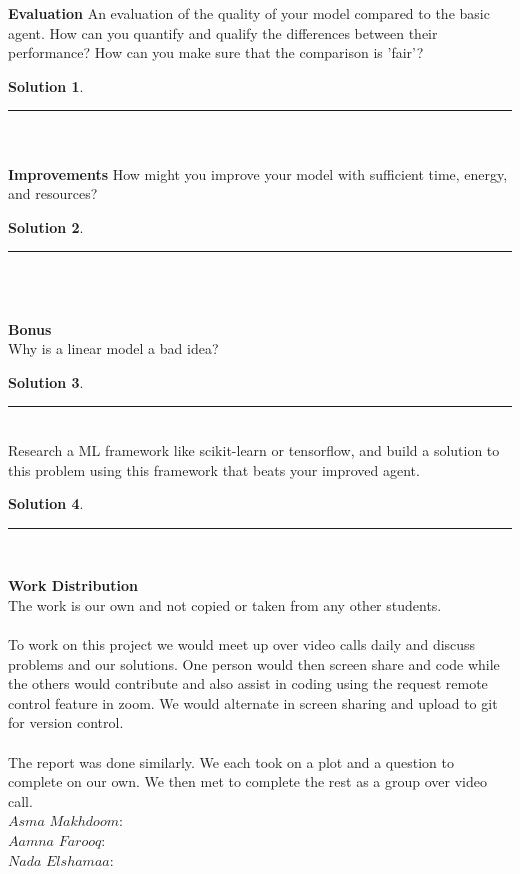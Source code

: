 \documentclass{article}
\theoremstyle{definition}
\def\fline{\rule{0.75\linewidth}{0.5pt}}
\newcommand{\finishline}{\vspace{-15pt}\begin{center}\fline\end{center}}
\newtheorem*{solution*}{Solution}
\newenvironment{solution}{\begin{solution*}}{{\finishline} \end{solution*}}
\begin{document}
    \textbf{Evaluation}
        An evaluation of the quality of your model compared to the basic agent. How can you quantify and qualify the differences between their performance? How can you make sure that the comparison is 'fair'? 
        \begin{solution} \hfill \\
    
        \end{solution}\\\\
        
    \textbf{Improvements}
        How might you improve your model with sufficient time, energy, and resources?
        \begin{solution} \hfill \\
    
        \end{solution}\\\\
\smallskip

\textbf{\Large Bonus} \\
    Why is a linear model a bad idea? 
    \begin{solution} \hfill \\
    
    \end{solution}\\
    
    Research a ML framework like scikit-learn or tensorflow, and build a solution to this problem using this framework that beats your improved agent.
    \begin{solution} \hfill \\
    
    \end{solution}\\

\smallskip   

\textbf{Work Distribution}
\\
The work is our own and not copied or taken from any other students. 
\\\\
To work on this project we would meet up over video calls daily and discuss problems and our solutions. One person would then screen share and code while the others would contribute and also assist in coding using the request remote control feature in zoom. We would alternate in screen sharing and upload to git for version control. 
\\\\
The report was done similarly. We each took on a plot and a question to complete on our own. We then met to complete the rest as a group over video call. 
\\
$Asma$ $Makhdoom:$ 
\\
$Aamna$ $Farooq:$ 
\\
$Nada$ $Elshamaa:$ 
\\
\smallskip
\end{document}
